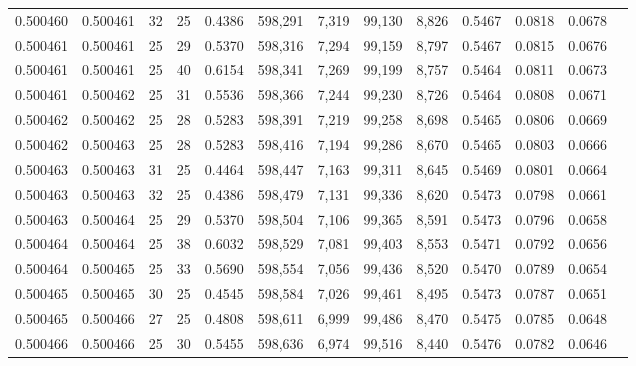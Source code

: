 \begin{tabular}{rrrrrrrrrrrrr}
0.500460 & 0.500461 &    32 &  25 &                                     0.4386 & 598,291 &   7,319 &  99,130 &   8,826 & 0.5467 & 0.0818 & 0.0678 \\
0.500461 & 0.500461 &    25 &  29 &                                     0.5370 & 598,316 &   7,294 &  99,159 &   8,797 & 0.5467 & 0.0815 & 0.0676 \\
0.500461 & 0.500461 &    25 &  40 &                                     0.6154 & 598,341 &   7,269 &  99,199 &   8,757 & 0.5464 & 0.0811 & 0.0673 \\
0.500461 & 0.500462 &    25 &  31 &                                     0.5536 & 598,366 &   7,244 &  99,230 &   8,726 & 0.5464 & 0.0808 & 0.0671 \\
0.500462 & 0.500462 &    25 &  28 &                                     0.5283 & 598,391 &   7,219 &  99,258 &   8,698 & 0.5465 & 0.0806 & 0.0669 \\
0.500462 & 0.500463 &    25 &  28 &                                     0.5283 & 598,416 &   7,194 &  99,286 &   8,670 & 0.5465 & 0.0803 & 0.0666 \\
0.500463 & 0.500463 &    31 &  25 &                                     0.4464 & 598,447 &   7,163 &  99,311 &   8,645 & 0.5469 & 0.0801 & 0.0664 \\
0.500463 & 0.500463 &    32 &  25 &                                     0.4386 & 598,479 &   7,131 &  99,336 &   8,620 & 0.5473 & 0.0798 & 0.0661 \\
0.500463 & 0.500464 &    25 &  29 &                                     0.5370 & 598,504 &   7,106 &  99,365 &   8,591 & 0.5473 & 0.0796 & 0.0658 \\
0.500464 & 0.500464 &    25 &  38 &                                     0.6032 & 598,529 &   7,081 &  99,403 &   8,553 & 0.5471 & 0.0792 & 0.0656 \\
0.500464 & 0.500465 &    25 &  33 &                                     0.5690 & 598,554 &   7,056 &  99,436 &   8,520 & 0.5470 & 0.0789 & 0.0654 \\
0.500465 & 0.500465 &    30 &  25 &                                     0.4545 & 598,584 &   7,026 &  99,461 &   8,495 & 0.5473 & 0.0787 & 0.0651 \\
0.500465 & 0.500466 &    27 &  25 &                                     0.4808 & 598,611 &   6,999 &  99,486 &   8,470 & 0.5475 & 0.0785 & 0.0648 \\
0.500466 & 0.500466 &    25 &  30 &                                     0.5455 & 598,636 &   6,974 &  99,516 &   8,440 & 0.5476 & 0.0782 & 0.0646 \\

\end{tabular}

